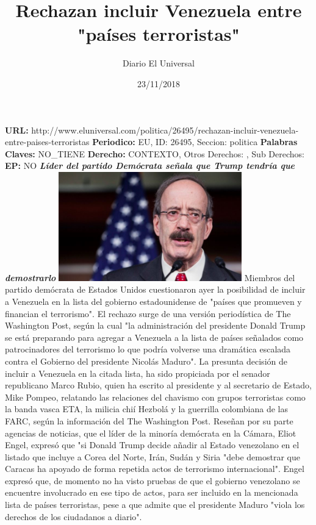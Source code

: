 \documentclass{article}%
\title{\textbf{Rechazan incluir Venezuela entre "países terroristas"}}%
\author{Diario El Universal}%
\date{23/11/2018}%
\begin{document}
%
\normalsize%
\maketitle%
\textbf{URL: }%
http://www.eluniversal.com/politica/26495/rechazan{-}incluir{-}venezuela{-}entre{-}paises{-}terroristas\newline%
%
\textbf{Periodico: }%
EU, %
ID: %
26495, %
Seccion: %
politica\newline%
%
\textbf{Palabras Claves: }%
NO\_TIENE\newline%
%
\textbf{Derecho: }%
CONTEXTO, %
Otros Derechos: %
, %
Sub Derechos: %
\newline%
%
\textbf{EP: }%
NO\newline%
\newline%
%
\textbf{\textit{Líder del partido Demócrata señala que Trump tendría que demostrarlo}}%
\newline%
\newline%
%
\includegraphics[width=300px]{126.JPG}%
\newline%
%
Miembros del partido demócrata de Estados Unidos cuestionaron ayer la posibilidad de incluir a  Venezuela en la lista del gobierno estadounidense de "países que promueven y  financian el terrorismo".%
\newline%
%
El rechazo surge de una versión periodística de The Washington Post, según la cual "la administración del presidente Donald Trump se está preparando para agregar a Venezuela a la lista de países señalados como patrocinadores del terrorismo lo que podría volverse una dramática escalada contra el Gobierno del presidente Nicolás Maduro".%
\newline%
%
La presunta decisión de incluir a Venezuela en la citada lista, ha sido propiciada por el senador republicano Marco Rubio, quien ha escrito al presidente y al secretario de Estado, Mike Pompeo, relatando las relaciones del chavismo con grupos terroristas como la banda vasca ETA, la milicia chií Hezbolá y la guerrilla colombiana de las FARC, según la información del The Washington Post.%
\newline%
%
Reseñan por su parte agencias de noticias, que el líder de la minoría demócrata en la Cámara, Eliot Engel, expresó que "si Donald Trump decide añadir al Estado venezolano en el listado que incluye a Corea del Norte, Irán, Sudán y Siria "debe demostrar que Caracas ha apoyado de forma repetida actos de terrorismo internacional".%
\newline%
%
Engel expresó que, de momento no ha visto pruebas de que el gobierno venezolano se encuentre involucrado en ese tipo de actos, para ser incluido en la mencionada lista de países terroristas, pese a que admite que el presidente Maduro "viola los derechos de los ciudadanos  a diario".%
\newline%
%
\end{document}
